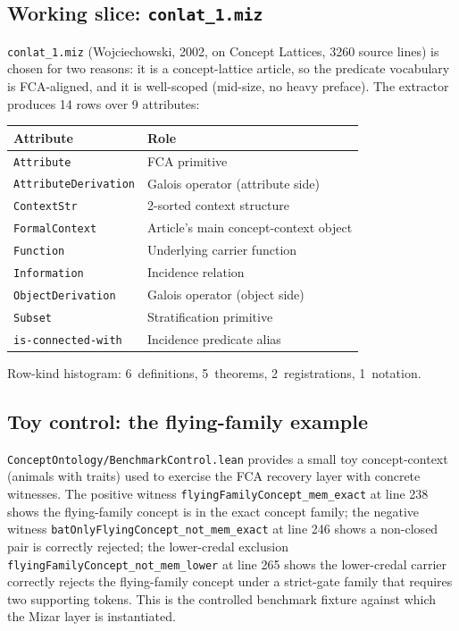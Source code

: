 \documentclass[]{article}
\newcommand{\lid}[1]{{\ttfamily\nolinkurl{#1}}}
\newcommand{\lpath}[1]{\texttt{\nolinkurl{#1}}}
\begin{document}
\subsection{Working slice: \texorpdfstring{\lid{conlat\_1.miz}}{conlat\_1.miz}}\label{sec:mizar-data}

\lid{conlat\_1.miz} (Wojciechowski, 2002, on Concept Lattices, 3260 source lines)
is chosen for two reasons: it is a concept-lattice article, so the predicate
vocabulary is FCA-aligned, and it is well-scoped (mid-size, no
heavy preface). The extractor produces 14 rows over 9 attributes:

\begin{center}\small
\begin{tabular}{ll}
\toprule
\textbf{Attribute} & \textbf{Role} \\
\midrule
\lid{Attribute}            & FCA primitive \\
\lid{AttributeDerivation}  & Galois operator (attribute side) \\
\lid{ContextStr}           & 2-sorted context structure \\
\lid{FormalContext}        & Article's main concept-context object \\
\lid{Function}             & Underlying carrier function \\
\lid{Information}          & Incidence relation \\
\lid{ObjectDerivation}     & Galois operator (object side) \\
\lid{Subset}               & Stratification primitive \\
\lid{is-connected-with}    & Incidence predicate alias \\
\bottomrule
\end{tabular}
\end{center}

\noindent Row-kind histogram: 6~definitions, 5~theorems, 2~registrations, 1~notation.

\subsection{Toy control: the flying-family example}\label{sec:mizar-control}

\lpath{ConceptOntology/BenchmarkControl.lean} provides a small toy concept-context
(animals with traits) used to exercise the FCA recovery layer with concrete witnesses.
The positive witness
\lid{flyingFamilyConcept\_mem\_exact} at line 238 shows the flying-family concept is
in the exact concept family; the negative witness
\lid{batOnlyFlyingConcept\_not\_mem\_exact} at line 246 shows a non-closed pair is
correctly rejected; the lower-credal exclusion
\lid{flyingFamilyConcept\_not\_mem\_lower} at line 265 shows the lower-credal carrier
correctly rejects the flying-family concept under a strict-gate family that requires
two supporting tokens. This is the controlled benchmark fixture against which the
Mizar layer is instantiated.
\end{document}
